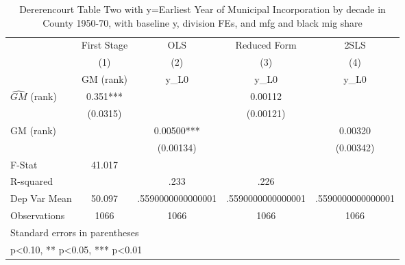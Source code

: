\begin{table}[htbp]\centering
\def\sym#1{\ifmmode^{#1}\else\(^{#1}\)\fi}
\caption{Dererencourt Table Two with y=Earliest Year of Municipal Incorporation by decade in County 1950-70, with baseline y, division FEs, and mfg and black mig share}
\begin{tabular}{l*{4}{c}}
\toprule
                    & First Stage   &         OLS   &Reduced Form   &        2SLS   \\
                    &\multicolumn{1}{c}{(1)}&\multicolumn{1}{c}{(2)}&\multicolumn{1}{c}{(3)}&\multicolumn{1}{c}{(4)}\\
                    &\multicolumn{1}{c}{GM  (rank)}&\multicolumn{1}{c}{y\_L0}&\multicolumn{1}{c}{y\_L0}&\multicolumn{1}{c}{y\_L0}\\
\midrule
$\hat{GM}$ (rank)   &       0.351***&               &     0.00112   &               \\
                    &    (0.0315)   &               &   (0.00121)   &               \\
\addlinespace
GM  (rank)          &               &     0.00500***&               &     0.00320   \\
                    &               &   (0.00134)   &               &   (0.00342)   \\
\midrule
F-Stat              &      41.017   &               &               &               \\
R-squared           &               &        .233   &        .226   &               \\
Dep Var Mean        &      50.097   &.5590000000000001   &.5590000000000001   &.5590000000000001   \\
Observations        &        1066   &        1066   &        1066   &        1066   \\
\bottomrule
\multicolumn{5}{l}{\footnotesize Standard errors in parentheses}\\
\multicolumn{5}{l}{\footnotesize * p<0.10, ** p<0.05, *** p<0.01}\\
\end{tabular}
\end{table}

